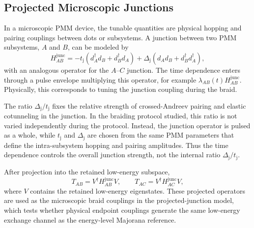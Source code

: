 \subsection{Projected Microscopic Junctions\newline}
In a microscopic PMM device, the tunable quantities are physical hopping and pairing couplings between dots or subsystems. A junction between two PMM subsystems, $A$ and $B$, can be modeled by
\begin{equation}
H^{\mathrm{junc}}_{AB}
=
-t_{\mathrm{j}}\left(d_A^\dagger d_B+d_B^\dagger d_A\right)
+
\Delta_{\mathrm{j}}\left(d_A d_B+d_B^\dagger d_A^\dagger\right),
\label{eq:junctionHamiltonian}
\end{equation}
with an analogous operator for the $A$--$C$ junction. The time dependence enters through a pulse envelope multiplying this operator, for example $\lambda_{AB}(t)H^{\mathrm{junc}}_{AB}$. Physically, this corresponds to tuning the junction coupling during the braid.

The ratio $\Delta_{\mathrm{j}}/t_{\mathrm{j}}$ fixes the relative strength of crossed-Andreev pairing and elastic cotunneling in the junction. In the braiding protocol studied, this ratio is not varied independently during the protocol. Instead, the junction operator is pulsed as a whole, while $t_{\mathrm{j}}$ and $\Delta_{\mathrm{j}}$ are chosen from the same PMM parameters that define the intra-subsystem hopping and pairing amplitudes. Thus the time dependence controls the overall junction strength, not the internal ratio $\Delta_{\mathrm{j}}/t_{\mathrm{j}}$.

After projection into the retained low-energy subspace,
\begin{equation}
T_{AB}=V^\dagger H^{\mathrm{junc}}_{AB}V,
\qquad
T_{AC}=V^\dagger H^{\mathrm{junc}}_{AC}V ,
\end{equation}
where $V$ contains the retained low-energy eigenstates. These projected operators are used as the microscopic braid couplings in the projected-junction model, which tests whether physical endpoint couplings generate the same low-energy exchange channel as the energy-level Majorana reference.

